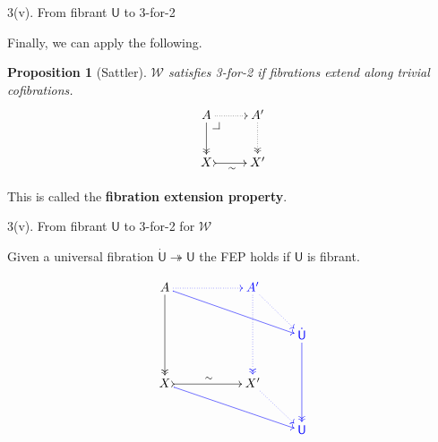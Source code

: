 \documentclass[handout]{beamer}
\makeatletter
\newcommand{\myemph}[1]{\textbf{#1}}    %
\newcommand{\pbcorner}[1][dr]{\save*!/#1-1.2pc/#1:(-1,1)@^{|-}\restore}
\renewcommand{\epi}{\twoheadrightarrow}
\newcommand{\U}{\mathsf{U}}
\newcommand{\UU}{\dot{\mathsf{U}}}
\newcommand{\II}{\mathbb{I}}
\newtheorem{proposition}[theorem]{Proposition}
\theoremstyle{remark}
\makeatother
\begin{document}
%
%
\begin{frame}{3(v). From fibrant $\U$ to 3-for-2}

Finally, we can apply the following.

\begin{proposition}[Sattler]
$\mathcal{W}$ satisfies 3-for-2 if fibrations extend along trivial cofibrations.
\[
\xymatrix{
A \ar@{->>}[d] \ar@{..>}[r] \pbcorner & A' \ar@{..>>}[d]\\
X \ar@{>->}[r]_{\sim} & X'
}
\]
\end{proposition}
This is called the \myemph{fibration extension property}.

\end{frame}
\begin{frame}{3(v). From fibrant $\U$ to 3-for-2 for $\mathcal{W}$}

\begin{lemma}
Given a universal fibration $\UU\epi\U$ the FEP holds if $\U$ is fibrant.

\[
\xymatrix{
A \ar@[blue][rrrd] \ar@{->>}[dd] \ar@[blue]@{..>}[rr] && {\color{blue}A'} \ar@[blue]@{..>}[rd] \ar@[blue]@{..>>}[dd] & \\
&&&{\color{blue}\UU} \ar@[blue]@{->>}[dd]  \\
X \ar@[blue][rrrd] \ar@{>->}[rr]^{\sim} && X' \ar@[blue]@{..>}[rd] & \\
&&& {\color{blue}\U}
}
\]
\end{lemma}

\end{frame}
%
%
\end{document}
